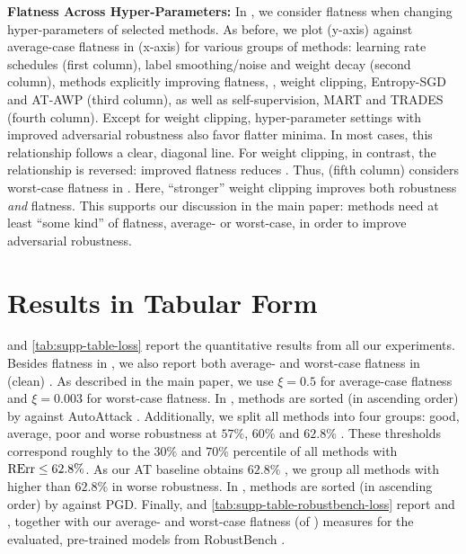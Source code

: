 \textbf{Flatness Across Hyper-Parameters:}
%
In , we consider flatness when changing hyper-parameters of selected methods. As before, we plot \RCE (y-axis) against average-case flatness in \RCE (x-axis) for various groups of methods: learning rate schedules (first column), label smoothing/noise and weight decay (second column), methods explicitly improving flatness, \ie, weight clipping, Entropy-SGD and AT-AWP (third column), as well as self-supervision, MART and TRADES (fourth column). Except for weight clipping, hyper-parameter settings with improved adversarial robustness also favor flatter minima. In most cases, this relationship follows a clear, diagonal line. For weight clipping, in contrast, the relationship is reversed: improved flatness reduces \RCE. Thus,  (fifth column) considers worst-case flatness in \RCE. Here, ``stronger'' weight clipping improves both robustness \emph{and} flatness. This supports our discussion in the main paper: methods need at least ``some kind'' of flatness, average- or worst-case, in order to improve adversarial robustness.

\section{Results in Tabular Form}
\label{sec:supp-results}

 and \ref{tab:supp-table-loss} report the quantitative results from all our experiments. Besides flatness in \RCE, we also report both average- and worst-case flatness in (clean) \CE. As described in the main paper, we use $\xi = 0.5$ for average-case flatness and $\xi = 0.003$ for worst-case flatness. In , methods are sorted (in ascending order) by \RTE against AutoAttack \cite{CroceICML2020}. Additionally, we split all methods into four groups: \colorbox{colorbrewer3!15}{good}, \colorbox{colorbrewer5!15}{average}, \colorbox{colorbrewer1!15}{poor} and \colorbox{colorbrewer0!15}{worse} robustness at $57\%$, $60\%$ and $62.8\%$ \RTE. These thresholds correspond roughly to the $30\%$ and $70\%$ percentile of all methods with $\RTE \leq 62.8\%$. As our AT baseline obtains $62.8\%$ \RTE, we group all methods with higher \RTE than $62.8\%$ in \colorbox{colorbrewer0!15}{worse} robustness. In , methods are sorted (in ascending order) by \RCE against PGD. Finally,  and \ref{tab:supp-table-robustbench-loss} report \RTE and \RCE, together with our average- and worst-case flatness (of \RCE) measures for the evaluated, pre-trained models from RobustBench \cite{CroceARXIV2020b}.

